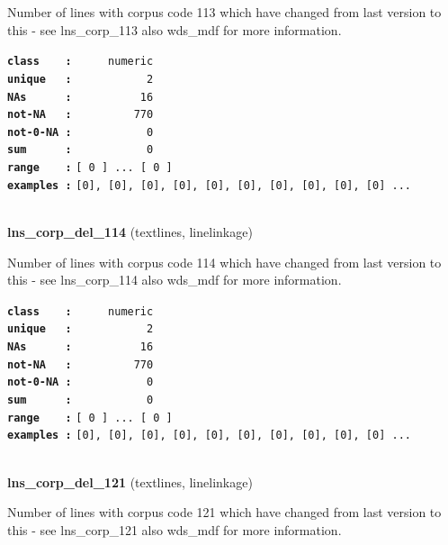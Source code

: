 \documentclass[]{article}
\begin{document}
Number of lines with corpus code 113 which have changed from last
version to this - see lns\_corp\_113 also wds\_mdf for more information.

\textbf{\texttt{class\ \ \ \ :}} \texttt{~~~~~numeric}\\
\textbf{\texttt{unique\ \ \ :}} \texttt{~~~~~~~~~~~2}\\
\textbf{\texttt{NAs\ \ \ \ \ \ :}} \texttt{~~~~~~~~~~16}\\
\textbf{\texttt{not-NA\ \ \ :}} \texttt{~~~~~~~~~770}\\
\textbf{\texttt{not-0-NA\ :}} \texttt{~~~~~~~~~~~0}\\
\textbf{\texttt{sum\ \ \ \ \ \ :}} \texttt{~~~~~~~~~~~0}\\
\textbf{\texttt{range\ \ \ \ :}}
\texttt{{[}\ 0\ {]}\ ...\ {[}\ 0\ {]}}\\
\textbf{\texttt{examples\ :}}
\texttt{{[}0{]},\ {[}0{]},\ {[}0{]},\ {[}0{]},\ {[}0{]},\ {[}0{]},\ {[}0{]},\ {[}0{]},\ {[}0{]},\ {[}0{]}\ ...}\\

~

\textbf{lns\_corp\_del\_114} (textlines, linelinkage)

Number of lines with corpus code 114 which have changed from last
version to this - see lns\_corp\_114 also wds\_mdf for more information.

\textbf{\texttt{class\ \ \ \ :}} \texttt{~~~~~numeric}\\
\textbf{\texttt{unique\ \ \ :}} \texttt{~~~~~~~~~~~2}\\
\textbf{\texttt{NAs\ \ \ \ \ \ :}} \texttt{~~~~~~~~~~16}\\
\textbf{\texttt{not-NA\ \ \ :}} \texttt{~~~~~~~~~770}\\
\textbf{\texttt{not-0-NA\ :}} \texttt{~~~~~~~~~~~0}\\
\textbf{\texttt{sum\ \ \ \ \ \ :}} \texttt{~~~~~~~~~~~0}\\
\textbf{\texttt{range\ \ \ \ :}}
\texttt{{[}\ 0\ {]}\ ...\ {[}\ 0\ {]}}\\
\textbf{\texttt{examples\ :}}
\texttt{{[}0{]},\ {[}0{]},\ {[}0{]},\ {[}0{]},\ {[}0{]},\ {[}0{]},\ {[}0{]},\ {[}0{]},\ {[}0{]},\ {[}0{]}\ ...}\\

~

\textbf{lns\_corp\_del\_121} (textlines, linelinkage)

Number of lines with corpus code 121 which have changed from last
version to this - see lns\_corp\_121 also wds\_mdf for more information.
\end{document}
